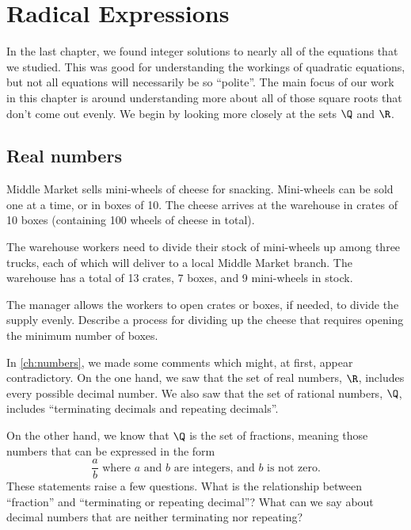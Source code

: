 \chapter{Radical Expressions}
\label{ch:radicals}

\newcommand*\rfrac[2]{{}^{#1}\!/_{#2}}


In the last chapter, we found integer solutions to nearly all of the equations that we studied. This was good for understanding the workings of quadratic equations, but not all equations will necessarily be so ``polite''. The main focus of our work in this chapter is around understanding more about all of those square roots that don't come out evenly. We begin by looking more closely at the sets $\Q$ and $\R$.

\section{Real numbers}
\label{sec:radrealnumbers}

\begin{boxexplore}
Middle Market sells mini-wheels of cheese for snacking. Mini-wheels can be sold one at a time, or in boxes of 10. The cheese arrives at the warehouse in crates of 10 boxes (containing 100 wheels of cheese in total).

The warehouse workers need to divide their stock of mini-wheels up among three trucks, each of which will deliver to a local Middle Market branch. The warehouse has a total of 13 crates, 7 boxes, and 9 mini-wheels in stock.

The manager allows the workers to open crates or boxes, if needed, to divide the supply evenly. Describe a process for dividing up the cheese that requires opening the minimum number of boxes.
\end{boxexplore}

In \cref{ch:numbers}, we made some comments which might, at first, appear contradictory. On the one hand, we saw that the set of real numbers, $\R$, includes every possible decimal number. We also saw that the set of rational numbers, $\Q$, includes ``terminating decimals and repeating decimals''. 

On the other hand, we know that $\Q$ is the set of fractions, meaning those numbers that can be expressed in the form \[\frac{a}{b} \text{ where $a$ and $b$ are integers, and $b$ is not zero.}\]
These statements raise a few questions. What is the relationship between ``fraction'' and ``terminating or repeating decimal''? What can we say about decimal numbers that are neither terminating nor repeating?

